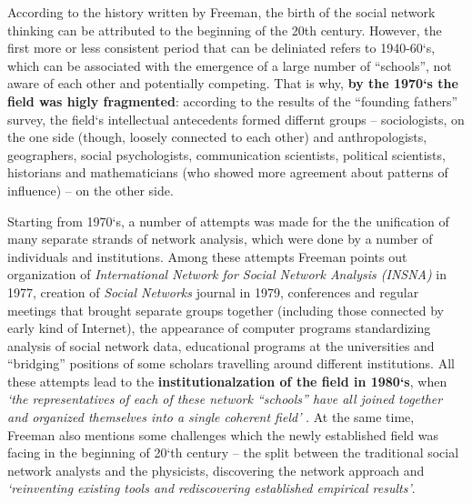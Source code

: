 \documentclass[11pt]{article} %
\newcommand{\Remark}[1]{\ifodd\value{page} \normalmarginpar
 \else \reversemarginpar \fi \marginpar{{\footnotesize #1}} }
\begin{document}
According to the history written by Freeman, the birth of the social network thinking can be attributed to the beginning of the 20th century. However, the first more or less consistent period that can be deliniated refers to 1940-60`s, which can be associated with the emergence of a large number of “schools”, not aware of each other and potentially competing. That is why, \textbf{by the 1970`s the field was higly fragmented}: according to the results of the “founding fathers” survey, the field`s intellectual antecedents formed differnt groups -- sociologists, on the one side (though, loosely connected to each other) and anthropologists, geographers, social psychologists, communication scientists, political scientists, historians and mathematicians (who showed more agreement about patterns of influence) -- on the other side. \medskip 

Starting from 1970`s, a number of attempts was made for the the unification of many separate strands of network analysis, which were done by a number of individuals and institutions. Among these attempts Freeman points out organization of \textit{International Network for Social Network Analysis (INSNA)} in 1977, creation of \textit{Social Networks} journal in 1979, conferences and regular meetings that brought separate groups together (including those connected by early kind of Internet), the appearance of computer programs standardizing analysis of social network data, educational programs at the universities and “bridging” positions of some scholars travelling around different institutions. All these attempts lead to the \textbf{institutionalzation of the field in 1980`s}, when \textit{`the representatives of each of these network “schools” have all joined together and organized themselves into a single coherent field'} \citep{SNAdev}. At the same time, Freeman also mentions some challenges which the newly established field was facing in the beginning of 20`th century -- the split \Remark{Another word} between the traditional social network analysts and the physicists, discovering the network approach and \textit{`reinventing existing tools and rediscovering established empirical results'}. \medskip 
\end{document}
